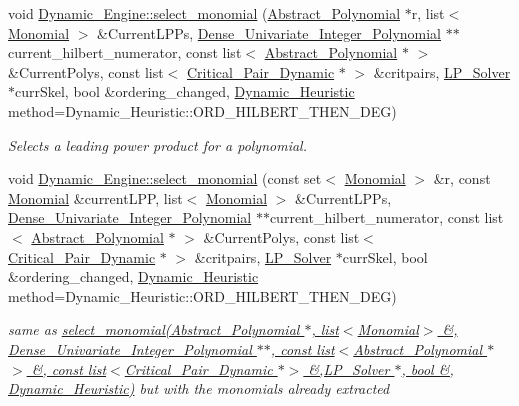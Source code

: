 \begin{DoxyCompactItemize}
void \hyperlink{group___g_b_computation_gaa01d88c431b84deabf51ee116d7d2a0e}{Dynamic\+\_\+\+Engine\+::select\+\_\+monomial} (\hyperlink{group__polygroup_class_abstract___polynomial}{Abstract\+\_\+\+Polynomial} $\ast$r, list$<$ \hyperlink{group__polygroup_class_monomial}{Monomial} $>$ \&Current\+L\+P\+Ps, \hyperlink{group__polygroup_class_dense___univariate___integer___polynomial}{Dense\+\_\+\+Univariate\+\_\+\+Integer\+\_\+\+Polynomial} $\ast$$\ast$current\+\_\+hilbert\+\_\+numerator, const list$<$ \hyperlink{group__polygroup_class_abstract___polynomial}{Abstract\+\_\+\+Polynomial} $\ast$ $>$ \&Current\+Polys, const list$<$ \hyperlink{group___g_b_computation_class_critical___pair___dynamic}{Critical\+\_\+\+Pair\+\_\+\+Dynamic} $\ast$ $>$ \&critpairs, \hyperlink{group___c_l_s_solvers_class_l_p___solvers_1_1_l_p___solver}{L\+P\+\_\+\+Solver} $\ast$curr\+Skel, bool \&ordering\+\_\+changed, \hyperlink{group___g_b_computation_ga819b1fd40d9a40ff303df3b90647ecb0}{Dynamic\+\_\+\+Heuristic} method=Dynamic\+\_\+\+Heuristic\+::\+O\+R\+D\+\_\+\+H\+I\+L\+B\+E\+R\+T\+\_\+\+T\+H\+E\+N\+\_\+\+D\+EG)
\begin{DoxyCompactList}\small\item\em Selects a leading power product for a polynomial. \end{DoxyCompactList}\item 
void \hyperlink{group___g_b_computation_gabe3fa16acb0927bac0b16e3a4cf4b4f5}{Dynamic\+\_\+\+Engine\+::select\+\_\+monomial} (const set$<$ \hyperlink{group__polygroup_class_monomial}{Monomial} $>$ \&r, const \hyperlink{group__polygroup_class_monomial}{Monomial} \&current\+L\+PP, list$<$ \hyperlink{group__polygroup_class_monomial}{Monomial} $>$ \&Current\+L\+P\+Ps, \hyperlink{group__polygroup_class_dense___univariate___integer___polynomial}{Dense\+\_\+\+Univariate\+\_\+\+Integer\+\_\+\+Polynomial} $\ast$$\ast$current\+\_\+hilbert\+\_\+numerator, const list$<$ \hyperlink{group__polygroup_class_abstract___polynomial}{Abstract\+\_\+\+Polynomial} $\ast$ $>$ \&Current\+Polys, const list$<$ \hyperlink{group___g_b_computation_class_critical___pair___dynamic}{Critical\+\_\+\+Pair\+\_\+\+Dynamic} $\ast$ $>$ \&critpairs, \hyperlink{group___c_l_s_solvers_class_l_p___solvers_1_1_l_p___solver}{L\+P\+\_\+\+Solver} $\ast$curr\+Skel, bool \&ordering\+\_\+changed, \hyperlink{group___g_b_computation_ga819b1fd40d9a40ff303df3b90647ecb0}{Dynamic\+\_\+\+Heuristic} method=Dynamic\+\_\+\+Heuristic\+::\+O\+R\+D\+\_\+\+H\+I\+L\+B\+E\+R\+T\+\_\+\+T\+H\+E\+N\+\_\+\+D\+EG)
\begin{DoxyCompactList}\small\item\em same as {\ttfamily \hyperlink{group___g_b_computation_gaa01d88c431b84deabf51ee116d7d2a0e}{select\+\_\+monomial(\+Abstract\+\_\+\+Polynomial $\ast$, list$<$\+Monomial$>$ \&, Dense\+\_\+\+Univariate\+\_\+\+Integer\+\_\+\+Polynomial $\ast$$\ast$, const list$<$\+Abstract\+\_\+\+Polynomial $\ast$$>$ \&, const list$<$\+Critical\+\_\+\+Pair\+\_\+\+Dynamic $\ast$$>$ \&,\+L\+P\+\_\+\+Solver $\ast$, bool \&, Dynamic\+\_\+\+Heuristic)}} but with the monomials already extracted \end{DoxyCompactList}\item 

\end{DoxyCompactItemize}
